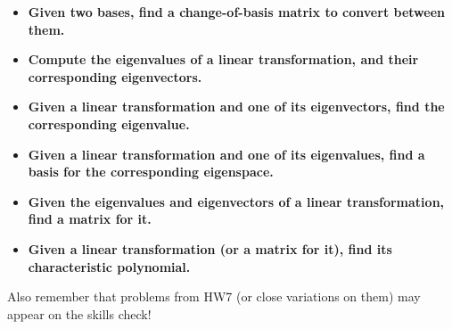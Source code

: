 \documentclass[10pt]{article}
\begin{document}
\begin{itemize}
	\item \textbf{Given two bases, find a change-of-basis matrix to convert between them.}
	\item \textbf{Compute the eigenvalues of a linear transformation, and their corresponding eigenvectors.}
	\item \textbf{Given a linear transformation and one of its eigenvectors, find the corresponding eigenvalue.}
	\item \textbf{Given a linear transformation and one of its eigenvalues, find a basis for the corresponding eigenspace.}
	\item \textbf{Given the eigenvalues and eigenvectors of a linear transformation, find a matrix for it.}
	\item \textbf{Given a linear transformation (or a matrix for it), find its characteristic polynomial.}
\end{itemize}

Also remember that problems from HW7 (or close variations on them) may appear on the skills check!
\end{document}
